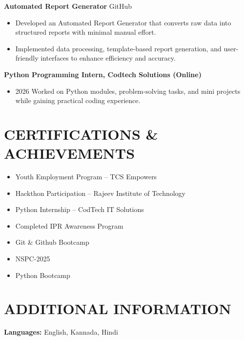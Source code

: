 \documentclass[10pt,a4paper]{extarticle}
\begin{document}
\noindent \textbf{Automated Report Generator} \hfill GitHub
\begin{itemize}[leftmargin=*, parsep=0pt, itemsep=1pt, topsep=1pt]
    \item Developed an Automated Report Generator that converts raw data into structured reports with minimal manual effort.
    \item Implemented data processing, template-based report generation, and user-friendly interfaces to enhance efficiency and accuracy.
\end{itemize}

\noindent \textbf{Python Programming Intern, Codtech Solutions (Online)}
\begin{itemize}[leftmargin=*, parsep=0pt, itemsep=1pt, topsep=1pt]
    \item 2026 Worked on Python modules, problem-solving tasks, and mini projects while gaining practical coding experience.
\end{itemize}



\section*{CERTIFICATIONS \& ACHIEVEMENTS}

\begin{itemize}[leftmargin=*, parsep=0pt, itemsep=1pt, topsep=1pt]
    \item Youth Employment Program – TCS Empowers
    \item Hackthon Participation – Rajeev Institute of Technology
    \item Python Internship – CodTech IT Solutions
    \item Completed IPR Awareness Program
    \item Git \& Github Bootcamp
    \item NSPC-2025
    \item Python Bootcamp
\end{itemize}



\section*{ADDITIONAL INFORMATION}

\textbf{Languages:} English, Kannada, Hindi
\end{document}
